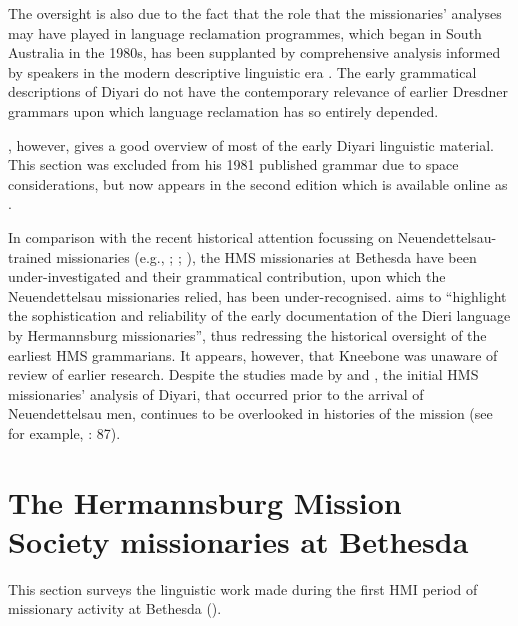 The oversight is also due to the fact that the role that the missionaries' analyses may have played in language reclamation programmes, which began in South Australia in the 1980s, has been supplanted by comprehensive analysis informed by speakers in the modern descriptive linguistic era \citep{austin_switch_1981}. The early grammatical descriptions of Diyari do not have the contemporary relevance of earlier Dresdner grammars upon which language reclamation has so entirely depended.

\citet{austin_grammar_1978}, however, gives a good overview of most of the early Diyari linguistic material. This section was excluded from his 1981 published grammar due to space considerations, but now appears in the second edition which is available online as \citet[241--245]{austin_grammar_2013}.

\largerpage
\hspace*{-3.3pt}In comparison with the recent historical attention focussing on Neuendettelsau-trained missionaries (e.g., \citealt{Hercus_Schwarzschild1981}; \citealt{jones_art_1986}; \citealt{nobbs_bush_2005}), the HMS missionaries at Bethesda have been under-investigated and their grammatical contribution, upon which the Neuendettelsau missionaries relied, has been under-recognised. \citet[24]{kneebone_teichelmann_2005} aims to “highlight the sophistication and reliability of the early documentation of the Dieri language by Hermannsburg missionaries”, thus redressing the historical oversight of the earliest HMS grammarians. It appears, however, that Kneebone was unaware of  review of earlier research. Despite the studies made by \citet{austin_grammar_1978} and \citet{kneebone_teichelmann_2005}, the initial HMS missionaries' analysis of Diyari, that occurred prior to the arrival of Neuendettelsau men, continues to be overlooked in histories of the mission (see for example, \citealt{kenny_arandas_2013}: 87).

\section{{The Hermannsburg Mission Society missionaries at Bethesda}}
\label{sec:key:8.3}\label{bkm:Ref456005923}

This section surveys the linguistic work made during the first HMI period of missionary activity at Bethesda ().


